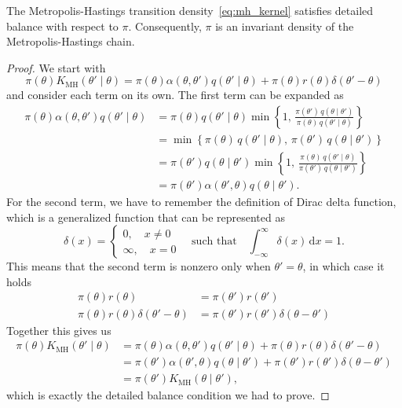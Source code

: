 \begin{theorem}
    \label{thm:mh_detailed_balance}
    The Metropolis-Hastings transition density~\eqref{eq:mh_kernel} satisfies detailed balance with respect to $\pi$. Consequently, $\pi$ is an invariant density of the Metropolis-Hastings chain.
\end{theorem}
\begin{proof}
    We start with
    \begin{equation*}
        \pi(\theta)K_{\mathrm{MH}}(\theta' \mid \theta) = \pi(\theta)\alpha(\theta,\theta')q(\theta' \mid \theta) + \pi(\theta)r(\theta)\delta(\theta' - \theta)
    \end{equation*}
    and consider each term on its own. The first term can be expanded as
    \begin{align*}
        \pi(\theta)\alpha(\theta,\theta')q(\theta' \mid \theta) &= \pi(\theta)q(\theta' \mid \theta) \min\left\{1,\, \frac{\pi(\theta')\,q(\theta\mid\theta')}{\pi(\theta)\,q(\theta'\mid\theta)}\right\} \\
        &= \min\left\{\pi(\theta)\,q(\theta' \mid \theta), \, \pi(\theta')\,q(\theta \mid \theta')\right\} \\
        &= \pi(\theta')q(\theta \mid \theta') \min\left\{1,\, \frac{\pi(\theta)\,q(\theta'\mid\theta)}{\pi(\theta')\,q(\theta\mid\theta')}\right\} \\
        &= \pi(\theta')\alpha(\theta',\theta)q(\theta \mid \theta').
    \end{align*}
    For the second term, we have to remember the definition of Dirac delta function, which is a generalized function that can be represented as
    \begin{equation*}
        \delta(x) = \begin{cases}
            0, \quad x \neq 0 \\
            \infty, \quad x = 0
        \end{cases} \quad \text{such that} \quad \int_{-\infty}^{\infty} \delta(x)\, \mathrm{d}x = 1.
    \end{equation*}
    This means that the second term is nonzero only when $\theta' = \theta$, in which case it holds
    \begin{align*}
        \pi(\theta)r(\theta) &= \pi(\theta')r(\theta') \\
        \pi(\theta)r(\theta)\delta(\theta' - \theta) &= \pi(\theta')r(\theta')\delta(\theta - \theta')
    \end{align*}
    Together this gives us
    \begin{align*}
        \pi(\theta)K_{\mathrm{MH}}(\theta' \mid \theta) &= \pi(\theta)\alpha(\theta,\theta')q(\theta' \mid \theta) + \pi(\theta)r(\theta)\delta(\theta' - \theta) \\
        &= \pi(\theta')\alpha(\theta',\theta)q(\theta \mid \theta') + \pi(\theta')r(\theta')\delta(\theta - \theta') \\
        &= \pi(\theta')K_{\mathrm{MH}}(\theta \mid \theta'),
    \end{align*}
    which is exactly the detailed balance condition we had to prove.
\end{proof}

